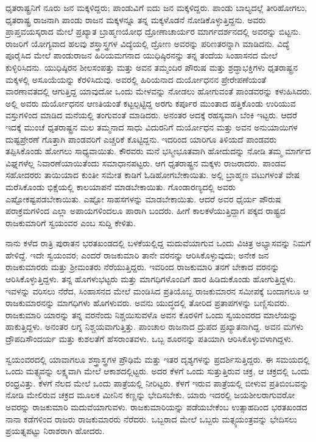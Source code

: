 ಧೃತರಾಷ್ಟ್ರನಿಗೆ ನೂರು ಜನ ಮಕ್ಕಳಿದ್ದರು; ಪಾಂಡುವಿಗೆ ಐದು ಜನ ಮಕ್ಕಳಿದ್ದರು. ಪಾಂಡು ಬಾಲ್ಯದಲ್ಲೆ ತೀರಿಹೋಗಲು, ಧೃತರಾಷ್ಟ್ರ ರಾಜನಾಗಿ ಪಾಂಡು ರಾಜನ ಮಕ್ಕಳನ್ನೂ ತನ್ನ ಮಕ್ಕಳೊಡನೆ ನೋಡಿಕೊಳ್ಳುತ್ತಿದ್ದನು. ಅವರು ಪ್ರಾಪ್ತವಯಸ್ಕರಾದ ಮೇಲೆ ಪ್ರಖ್ಯಾತ ಬ್ರಾಹ್ಮಣಯೋಧ ದ್ರೋಣಾಚಾರ್ಯರ ಮಾರ್ಗದರ್ಶನದಲ್ಲಿ ಅವರನ್ನು ಬಿಟ್ಟನು. ರಾಜರಿಗೆ ಯೋಗ್ಯವಾದ ಹಲವು ಶಸ್ತ್ರಾಸ್ತ್ರಗಳ ವಿದ್ಯೆಯಲ್ಲಿ ದ್ರೋಣ ಅವರನ್ನು ಪರಿಣತರನ್ನಾಗಿ ಮಾಡಿದನು. ವಿದ್ಯೆ ಪೂರೈಸಿದ ಮೇಲೆ ಪಾಂಡುರಾಜನ ಹಿರಿಯಮಗನಾದ ಯುಧಿಷ್ಠಿರನನ್ನು ತನ್ನ ತಂದೆಯ ಸಿಂಹಾಸನದ ಮೇಲೆ ಕುಳ್ಳಿರಿಸಿದನು. ಯುಧಿಷ್ಠಿರನ ಶೀಲಸಂಪತ್ತು ಮತ್ತು ಅವನ ತಮ್ಮಂದಿರ ಪೌರುಷ ಮತ್ತು ಶ್ರದ್ಧಾಭಕ್ತಿಗಳು ಧೃತರಾಷ್ಟ್ರನ ಮಕ್ಕಳಲ್ಲಿ ಅಸೂಯೆಯನ್ನು ಕೆರಳಿಸಿದುವು. ಅವರಲ್ಲಿ ಹಿರಿಯನಾದ ದುರ್ಯೋಧನನ ಪ್ರೇರೇಪಣೆಯಂತೆ ವಾರಣಾವತದಲ್ಲಿ ಆಗುತ್ತಿದ್ದ ಯಾವುದೋ ಒಂದು ಮೇಳವನ್ನು ನೋಡಲು ಹೋಗುವಂತೆ ಪಾಂಡವರನ್ನು ಕಳುಹಿಸಿದರು. ಅಲ್ಲಿ ಅವರು ದುರ್ಯೋಧನನ ಆಣತಿಯಂತೆ ಕಟ್ಟಲ್ಪಟ್ಟಿದ್ದ ಅರಗು ಕರ್ಪೂರ ಮುಂತಾದ ಹತ್ತಿಕೊಂಡು ಉರಿಯುವ ವಸ್ತುಗಳಿಂದ ಮಾಡಿದ ಮನೆಯಲ್ಲಿ ತಂಗುವಂತೆ ಮಾಡಿದರು. ಅನಂತರ ಅದಕ್ಕೆ ರಹಸ್ಯವಾಗಿ ಬೆಂಕಿ ಇಟ್ಟರು. ಆದರೆ ಇದಕ್ಕೆ ಮುಂಚೆ ಧೃತರಾಷ್ಟ್ರನ ಮಲ ತಮ್ಮನಾದ ಸಾಧು ವಿದುರನಿಗೆ ದುರ್ಯೋಧನ ಮತ್ತು ಅವನ ಅನುಯಾಯಿಗಳ ದುಷ್ಟಪ್ರೇರಣೆ ಗೊತ್ತಾಗಿ ಪಾಂಡವರಿಗೆ ಎಚ್ಚರಿಕೆ ಕೊಟ್ಟಿದ್ದನು. ಇದರಿಂದ ಯಾರಿಗೂ ತಿಳಿಯದೆ ಪಾಂಡವರು ತಪ್ಪಿಸಿಕೊಂಡು ಹೋಗಲು ಸಾಧ್ಯವಾಯಿತು. ಕೌರವರು ಮನೆ ಭಸ್ಮೀಭೂತವಾಗಿ ಹೋದುದನ್ನು ನೋಡಿ ತಮ್ಮ ಮಾರ್ಗದ ವಿಘ್ನಗಳೆಲ್ಲ ನಿವಾರಣೆಯಾಯಿತೆಂದು ಸಮಾಧಾನಪಟ್ಟರು. ಆಗ ಧೃತರಾಷ್ಟ್ರನ ಮಕ್ಕಳು ರಾಜರಾದರು. ಪಾಂಡವ ಸಹೋದರರು ತಾಯಿಯಾದ ಕುಂತೀ ಸಮೇತ ಕಾಡಿಗೆ ಓಡಿಹೋಗಬೇಕಾಯಿತು. ಅಲ್ಲಿ ಬ್ರಾಹ್ಮಣ ವಟುಗಳಂತೆ ವೇಷ ಮರೆಸಿಕೊಂಡು ಭಿಕ್ಷೆಯಲ್ಲಿ ಕಾಲಯಾಪನೆ ಮಾಡಬೇಕಾಯಿತು. ಗೊಂಡಾರಣ್ಯದಲ್ಲಿ ಅವರು ಎಷ್ಟೋ\break ಕಷ್ಟಪಡಬೇಕಾಯಿತು. ಎಷ್ಟೋ ಸಾಹಸಗಳನ್ನು ಮಾಡಬೇಕಾಯಿತು. ಆದರೆ ಅವರ ಧೈರ್ಯ ಪೌರುಷ ಪರಾಕ್ರಮಗಳಿಂದ ಎಲ್ಲಾ ಅಪಾಯಗಳಿಂದಲೂ ಪಾರಾಗಿ ಬಂದರು. ಹೀಗೆ ಕಾಲಕಳೆಯುತ್ತಿದ್ದಾಗ ಪಕ್ಕದ ರಾಷ್ಟ್ರದ ರಾಜಕುಮಾರಿಗೆ ಸ್ವಯಂವರ ಎಂಬ ಸುದ್ದಿ ಕೇಳಿತು.

\vskip 0.1cm

ನಾನು ಕಳೆದ ರಾತ್ರಿ ಪುರಾತನ ಭರತಖಂಡದಲ್ಲಿ ಬಳಕೆಯಲ್ಲಿದ್ದ ಮದುವೆಯಾಗುವ ಒಂದು ವಿಚಿತ್ರ ಅಭ್ಯಾಸವನ್ನು ನಿಮಗೆ ಹೇಳಿದ್ದೆ. ಇದೇ ಸ್ವಯಂವರ; ಎಂದರೆ ರಾಜಕುಮಾರಿ ತಾನೇ ವರನನ್ನು ಆರಿಸಿಕೊಳ್ಳುವುದು; ಅನೇಕ ಜನ ರಾಜಕುಮಾರರು ಮತ್ತು ಶ‍್ರೀಮಂತರು ನೆರೆಯುತ್ತಿದ್ದರು. ಇವರಿಂದ ರಾಜಕುಮಾರಿ ತನಗೆ ಬೇಕಾದ ವರನನ್ನು ಆರಿಸಿಕೊಳ್ಳುತ್ತಿದ್ದಳು. ತನ್ನ ಹೊಗಳುಭಟ್ಟರು ಮತ್ತು ಮಾಗಧಿಗಳೊಂದಿಗೆ ಹಾರ ಹಿಡಿದುಕೊಂಡು ಹೋಗುತ್ತಿದ್ದಳು. ಇವಳನ್ನು ವರಿಸಲು ನೆರೆದ, ಸಿಂಹಾಸನದ ಮೇಲೆ ಮಂಡಿಸಿದ ಪ್ರತಿಯೊಬ್ಬ ರಾಜಕುಮಾರನ ಸಮೀಪಕ್ಕೆ ಬಂದಾಗಲೂ ಆ ರಾಜಕುಮಾರನನ್ನು ಮಾಗಧಿಗಳು ಹೊಗಳುವರು. ಅವನು ಯುದ್ಧದಲ್ಲಿ ತೋರಿದ ಪ್ರತಾಪಗಳನ್ನು ಬಣ್ಣಿಸುವರು. ರಾಜಕುಮಾರಿ ಯಾರನ್ನು ತನ್ನ ವರನೆಂದು ನಿಶ್ಚಯಿಸುವಳೊ ಅವನ ಕೊರಳಿಗೆ ಒಂದು ಸ್ವಯಂವರದ ಮಾಲೆಯನ್ನು ಹಾಕುತ್ತಿದ್ದಳು. ಅನಂತರ ಲಗ್ನ ನಿಶ್ಚಯವಾಗುತ್ತಿತ್ತು. ಪಾಂಚಾಲ ರಾಜನಾದ ದ್ರುಪದ ಪ್ರಖ್ಯಾತನಾಗಿದ್ದ. ಅವನ ಮಗಳು ದ್ರೌಪದಿ\break ಸೌಂದರ್ಯ ಮತ್ತು ಕುಶಲತೆಗೆ ಹೆಸರಾಂತವಳು. ಒಬ್ಬ ಶೂರನನ್ನು ಪತಿಯಾಗಿ ಆರಿಸಿಕೊಳ್ಳುವಳಾಗಿದ್ದಳು.

\vskip 0.1cm

ಸ್ವಯಂವರದಲ್ಲಿ ಯಾವಾಗಲೂ ಶಸ್ತ್ರಾಸ್ತ್ರಗಳ ಪ್ರೌಢಿಮೆ ಮತ್ತು ಇತರ ದೃಶ್ಯಗಳನ್ನು ಪ್ರದರ್ಶಿಸುತ್ತಿದ್ದರು. ಈ ಸಮಯದಲ್ಲಿ ಒಂದು ಮತ್ಸ್ಯವನ್ನು ಲಕ್ಷ್ಯವಾಗಿ ಮೇಲೆ ಆಕಾಶದಲ್ಲಿಟ್ಟರು. ಅದರ ಕೆಳಗೆ ಒಂದು ಸುತ್ತುತ್ತಿರುವ ಚಕ್ರ, ಆ ಚಕ್ರದಲ್ಲಿ ಒಂದು ರಂಧ್ರವಿತ್ತು. ಕೆಳಗೆ ನೆಲದ ಮೇಲೆ ಒಂದು ಪಾತ್ರೆಯಲ್ಲಿ ನೀರಿಟ್ಟರು. ಕೆಳಗೆ ಇರುವ ಪಾತ್ರೆಯಲ್ಲಿ ಬೀಳುವ ಪ್ರತಿಬಿಂಬವನ್ನು ನೋಡಿ ಮೇಲಿರುವ ಚಕ್ರದ ಮೂಲಕ ಮೀನಿನ ಕಣ್ಣನ್ನು ಭೇದಿಸಬೇಕು. ಯಾರು ಇದರಲ್ಲಿ ಜಯಶೀಲರಾಗುವರೋ ಅವರನ್ನು ರಾಜಕುಮಾರಿ ಮದುವೆಯಾಗುವಳು. ರಾಜಕುಮಾರಿಯನ್ನು ಪಡೆಯಬೇಕೆಂಬ ಉತ್ಸಾಹದಿಂದ ಭರತಖಂಡದ ನಾನಾ ಕಡೆಗಳಿಂದ ರಾಜರು ರಾಜಕುಮಾರರು ನೆರೆದರು. ಒಬ್ಬರಾದ ಮೇಲೆ ಒಬ್ಬರು ಮತ್ಸ್ಯಯಂತ್ರವನ್ನು ಭೇದಿಸಲು ಪ್ರಯತ್ನಪಟ್ಟು ನಿರಾಶರಾಗಿ ಹೋದರು.

